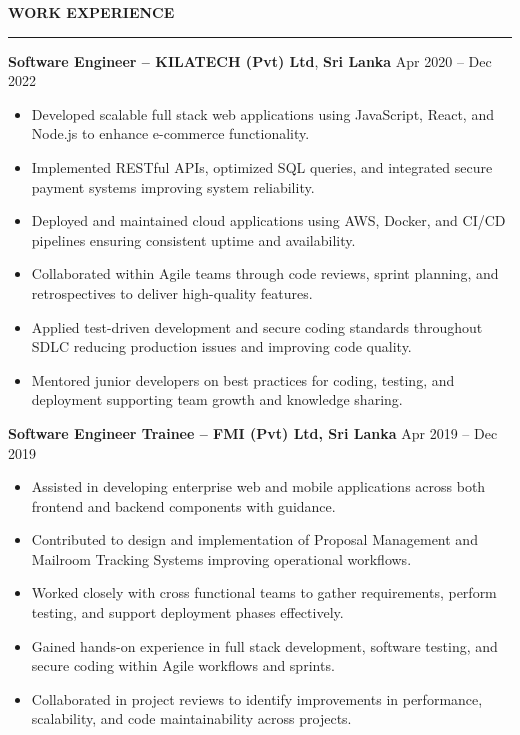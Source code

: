 \documentclass[10pt,letterpaper]{article}
\begin{document}
\vspace{8pt}

\textbf{WORK EXPERIENCE}\\[-8pt]
\noindent\rule{\textwidth}{1pt}

\vspace{-2pt}

\textbf{Software Engineer -- KILATECH (Pvt) Ltd}, \textbf{Sri Lanka} \hfill Apr 2020 -- Dec 2022

\vspace{-1pt}

\begin{itemize}
\item Developed scalable full stack web applications using JavaScript, React, and Node.js to enhance e-commerce functionality.
\item Implemented RESTful APIs, optimized SQL queries, and integrated secure payment systems improving system reliability.
\item Deployed and maintained cloud applications using AWS, Docker, and CI/CD pipelines ensuring consistent uptime and availability.
\item Collaborated within Agile teams through code reviews, sprint planning, and retrospectives to deliver high-quality features.
\item Applied test-driven development and secure coding standards throughout SDLC reducing production issues and improving code quality.
\item Mentored junior developers on best practices for coding, testing, and deployment supporting team growth and knowledge sharing.
\end{itemize}

\textbf{Software Engineer Trainee -- FMI (Pvt) Ltd, Sri Lanka} \hfill Apr 2019 -- Dec 2019

\vspace{-1pt}

\begin{itemize}
\item Assisted in developing enterprise web and mobile applications across both frontend and backend components with guidance.
\item Contributed to design and implementation of Proposal Management and Mailroom Tracking Systems improving operational workflows.
\item Worked closely with cross functional teams to gather requirements, perform testing, and support deployment phases effectively.
\item Gained hands-on experience in full stack development, software testing, and secure coding within Agile workflows and sprints.
\item Collaborated in project reviews to identify improvements in performance, scalability, and code maintainability across projects.
\end{itemize}
\end{document}
